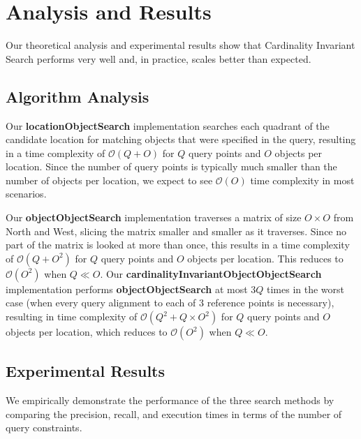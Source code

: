 \section{Analysis and Results}
\label{section:results}

Our theoretical analysis and experimental results show that Cardinality Invariant Search performs very well and, in practice, scales better than expected.

\subsection{Algorithm Analysis}

Our \textbf{locationObjectSearch} implementation searches each quadrant of the candidate location for matching objects that were specified in the query, resulting in a time complexity of $\mathcal{O}(Q + O)$ for $Q$ query points and $O$ objects per location. 
Since the number of query points is typically much smaller than the number of objects per location, we expect to see $\mathcal{O}(O)$ time complexity in most scenarios.

Our \textbf{objectObjectSearch} implementation traverses a matrix of size $O \times O$ from North and West, slicing the matrix smaller and smaller as it traverses. 
Since no part of the matrix is looked at more than once, this results in a time complexity of $\mathcal{O}(Q + O^2)$ for $Q$ query points and $O$ objects per location. 
This reduces to $\mathcal{O}(O^2)$ when $Q \ll O$. 
Our \textbf{cardinalityInvariantObjectObjectSearch} implementation performs \textbf{objectObjectSearch} at most $3Q$ times in the worst case (when every query alignment to each of 3 reference points is necessary), resulting in time complexity of $\mathcal{O}(Q^2 + Q\times O^2)$ for $Q$ query points and $O$ objects per location, which reduces to $\mathcal{O}(O^2)$ when $Q \ll O$. 


\subsection{Experimental Results}
We empirically demonstrate the performance of the three search methods by comparing the precision, recall, and execution times in terms of the number of query constraints. 

